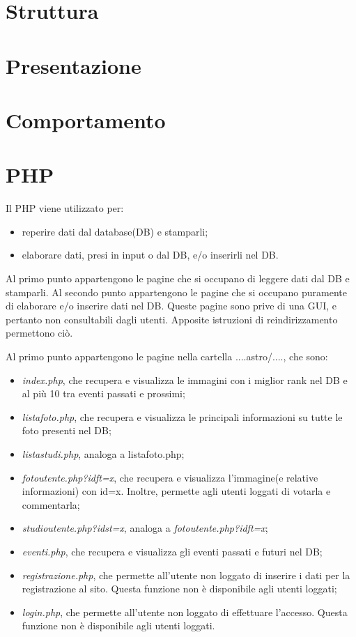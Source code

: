 \section{Struttura}
\section{Presentazione}
\section{Comportamento}
\section{PHP}

Il PHP viene utilizzato per:
 \begin{itemize}
 	\item reperire dati dal database(DB) e stamparli;
 	\item elaborare dati, presi in input o dal DB, e/o inserirli nel DB.
 \end{itemize} 
 
 Al primo punto appartengono le pagine che si occupano di leggere dati dal DB e stamparli.
 Al secondo punto appartengono le pagine che si occupano puramente di elaborare e/o inserire dati nel DB. Queste pagine sono prive di una GUI, e pertanto non consultabili dagli utenti. Apposite istruzioni di reindirizzamento permettono ciò.
 
 Al primo punto appartengono le pagine nella cartella ....astro/...., che sono:
 \begin{itemize}
 	\item \textit{index.php}, che recupera e visualizza le immagini con i miglior rank nel DB e al più 10 tra eventi passati e prossimi;
 	\item \textit{listafoto.php}, che recupera e visualizza le principali informazioni su tutte le foto presenti nel DB;
 	\item \textit{listastudi.php}, analoga a listafoto.php;
 	\item \textit{fotoutente.php?idft=x}, che recupera e visualizza l'immagine(e relative informazioni) con id=x. Inoltre, permette agli utenti loggati di votarla e commentarla;
 	\item \textit{studioutente.php?idst=x}, analoga a \textit{fotoutente.php?idft=x};
 	\item \textit{eventi.php}, che recupera e visualizza gli eventi passati e futuri nel DB;
 	\item \textit{registrazione.php}, che permette all'utente non loggato di inserire i dati per la registrazione al sito. Questa funzione non è disponibile agli utenti loggati;
 	\item \textit{login.php}, che permette all'utente non loggato di effettuare l'accesso. Questa funzione non è disponibile agli utenti loggati.
 \end{itemize}
 
